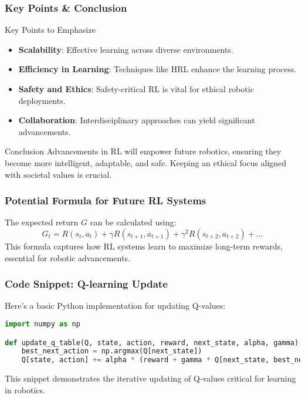 \documentclass[aspectratio=169]{beamer}
\begin{document}
\begin{frame}
    \frametitle{Key Points & Conclusion}
    \begin{block}{Key Points to Emphasize}
        \begin{itemize}
            \item \textbf{Scalability}: Effective learning across diverse environments.
            \item \textbf{Efficiency in Learning}: Techniques like HRL enhance the learning process.
            \item \textbf{Safety and Ethics}: Safety-critical RL is vital for ethical robotic deployments.
            \item \textbf{Collaboration}: Interdisciplinary approaches can yield significant advancements.
        \end{itemize}
    \end{block}

    \begin{block}{Conclusion}
        Advancements in RL will empower future robotics, ensuring they become more intelligent, adaptable, and safe. Keeping an ethical focus aligned with societal values is crucial.
    \end{block}
\end{frame}

\begin{frame}[fragile]
    \frametitle{Potential Formula for Future RL Systems}
    The expected return \( G \) can be calculated using:
    \begin{equation}
        G_t = R(s_t, a_t) + \gamma R(s_{t+1}, a_{t+1}) + \gamma^2 R(s_{t+2}, a_{t+2}) + \ldots
    \end{equation}
    This formula captures how RL systems learn to maximize long-term rewards, essential for robotic advancements.
\end{frame}

\begin{frame}[fragile]
    \frametitle{Code Snippet: Q-learning Update}
    Here’s a basic Python implementation for updating Q-values:
    \begin{lstlisting}[language=Python]
import numpy as np

def update_q_table(Q, state, action, reward, next_state, alpha, gamma):
    best_next_action = np.argmax(Q[next_state])
    Q[state, action] += alpha * (reward + gamma * Q[next_state, best_next_action] - Q[state, action])
    \end{lstlisting}
    This snippet demonstrates the iterative updating of Q-values critical for learning in robotics.
\end{frame}
\end{document}
